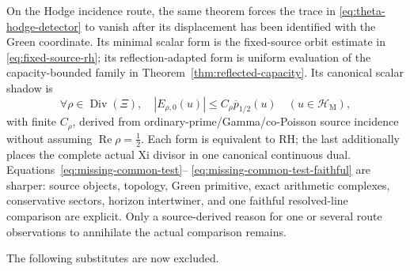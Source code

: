 \documentclass[11pt]{article}
\theoremstyle{definition}
\theoremstyle{remark}
\newcommand{\cH}{\mathcal H}
\newcommand{\Rea}{\operatorname{Re}}
\newcommand{\Div}{\operatorname{Div}}
\begin{document}
On the Hodge incidence route, the same theorem forces the trace in
\eqref{eq:theta-hodge-detector} to vanish after its displacement has been
identified with the Green coordinate.  Its minimal scalar form is the
fixed-source orbit estimate in \eqref{eq:fixed-source-rh}; its
reflection-adapted form is uniform evaluation of the capacity-bounded
family in Theorem~\ref{thm:reflected-capacity}.  Its canonical scalar shadow is
\[
  \forall\rho\in\Div(\Xi),\quad
  |E_{\rho,0}(u)|\le C_\rho\overline p_{1/2}(u)
  \quad(u\in\cH_{\mathrm M}),
\tag{7.18}\label{eq:missing-admission}
\]
with finite \(C_\rho\), derived from ordinary-prime/Gamma/co-Poisson source
incidence without assuming \(\Rea\rho=\tfrac12\).  Each form is equivalent
to RH; the last additionally places the complete actual Xi divisor in one
canonical continuous dual.  Equations~\eqref{eq:missing-common-test}--
\eqref{eq:missing-common-test-faithful} are sharper: source objects,
topology, Green primitive, exact arithmetic complexes, conservative sectors,
horizon intertwiner, and one faithful resolved-line comparison are explicit.
Only a source-derived reason for one or several route observations to
annihilate the actual comparison remains.

The following substitutes are now excluded.
\end{document}
